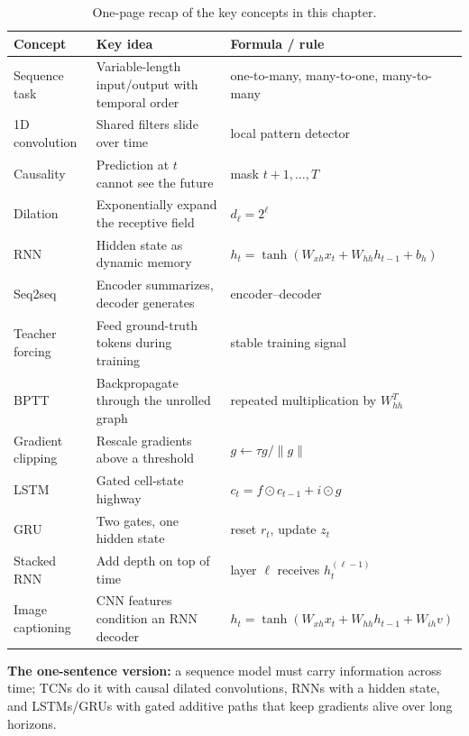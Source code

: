 \begin{table}[htbp]
\centering
\small
\renewcommand{\arraystretch}{1.15}
\begin{tabular}{p{} p{} p{}}
\toprule
\textbf{Concept} & \textbf{Key idea} & \textbf{Formula / rule} \\
\midrule
Sequence task & Variable-length input/output with temporal order & one-to-many, many-to-one, many-to-many \\
1D convolution & Shared filters slide over time & local pattern detector \\
Causality & Prediction at $t$ cannot see the future & mask $t+1, \dots, T$ \\
Dilation & Exponentially expand the receptive field & $d_\ell = 2^\ell$ \\
RNN & Hidden state as dynamic memory & $h_t = \tanh(W_{xh}x_t + W_{hh}h_{t-1} + b_h)$ \\
Seq2seq & Encoder summarizes, decoder generates & encoder--decoder \\
Teacher forcing & Feed ground-truth tokens during training & stable training signal \\
BPTT & Backpropagate through the unrolled graph & repeated multiplication by $W_{hh}^T$ \\
Gradient clipping & Rescale gradients above a threshold & $g \leftarrow \tau g / \|g\|$ \\
LSTM & Gated cell-state highway & $c_t = f \odot c_{t-1} + i \odot g$ \\
GRU & Two gates, one hidden state & reset $r_t$, update $z_t$ \\
Stacked RNN & Add depth on top of time & layer $\ell$ receives $h_t^{(\ell-1)}$ \\
Image captioning & CNN features condition an RNN decoder & $h_t = \tanh(W_{xh}x_t + W_{hh}h_{t-1} + W_{ih}v)$ \\
\bottomrule
\end{tabular}
\caption{One-page recap of the key concepts in this chapter.}\label{tab:ch3_recap}
\end{table}

\begin{InsightBox}
\textbf{The one-sentence version:} a sequence model must carry information across time; TCNs do it with causal dilated convolutions, RNNs with a hidden state, and LSTMs/GRUs with gated additive paths that keep gradients alive over long horizons.
\end{InsightBox}
